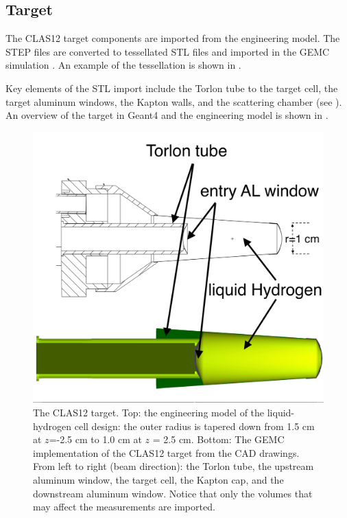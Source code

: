 \subsection{Target}

The CLAS12 target components are imported from the engineering model. The STEP files are converted to tessellated STL files and imported
in the GEMC simulation \cite{targetCorrection, targetStudy}. An example of the tessellation is shown in .

Key elements of the STL import include the Torlon tube to the target cell,
the target aluminum windows, the Kapton walls, and the scattering chamber (see ).
An overview of the target in Geant4 and the engineering model is shown in .

\begin{figure}
	\centering
	\includegraphics[width=0.99\columnwidth,keepaspectratio]{img/targetDesign.png}
	\caption{The CLAS12 target. Top: the engineering model of the liquid-hydrogen cell design: the outer radius is
             tapered down from 1.5 cm at $z$=-2.5 cm to 1.0 cm at $z$ = 2.5 cm.
             Bottom: The GEMC implementation of the CLAS12 target from the CAD drawings. From left to right (beam direction):
             the Torlon tube, the upstream aluminum window, the target cell, the Kapton cap, and the
			 downstream aluminum window. Notice that only the volumes that may affect the measurements are imported.}
	\label{fig:targetDesign}
\end{figure}


